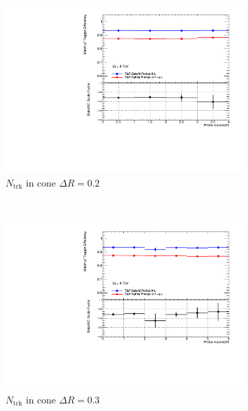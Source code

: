 \begin{figure}[phtb]
\begin{subfigure}[b]{0.31\textwidth}
      \includegraphics[width=\textwidth]{PartCalibration2012/Plots/SFPlots/nucone20_smt.pdf}  
      \caption{$N_{\textrm{trk}}$ in cone $\Delta R=0.2$} \label{fig:Alleffsfnucone20}
    \end{subfigure}
    ~
    \begin{subfigure}[b]{0.31\textwidth}
      \includegraphics[width=\textwidth]{PartCalibration2012/Plots/SFPlots/nucone30_smt.pdf}
      \caption{$N_{\textrm{trk}}$ in cone $\Delta R=0.3$} \label{fig:Alleffsfnucone30}
    \end{subfigure}
    ~
    \begin{subfigure}[b]{0.31\textwidth}

\end{subfigure}
\end{figure}
